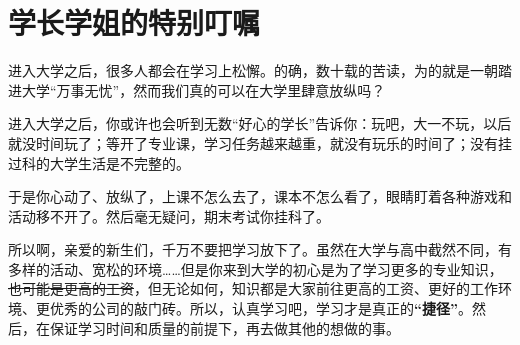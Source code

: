 \section[学长学姐的特别叮嘱]{学长学姐的特别叮嘱}

进入大学之后，很多人都会在学习上松懈。的确，数十载的苦读，为的就是一朝踏进大学“万事无忧”，然而我们真的可以在大学里肆意放纵吗？

进入大学之后，你或许也会听到无数“好心的学长”告诉你：玩吧，大一不玩，以后就没时间玩了；等开了专业课，学习任务越来越重，就没有玩乐的时间了；没有挂过科的大学生活是不完整的。

于是你心动了、放纵了，上课不怎么去了，课本不怎么看了，眼睛盯着各种游戏和活动移不开了。然后毫无疑问，期末考试你挂科\footnotemark 了。

所以啊，亲爱的新生们，千万不要把学习放下了。虽然在大学与高中截然不同，有多样的活动、宽松的环境……但是你来到大学的初心是为了学习更多的专业知识，\sout{也可能是更高的工资}，但无论如何，知识都是大家前往更高的工资、更好的工作环境、更优秀的公司的敲门砖。所以，认真学习吧，学习才是真正的\textbf{“捷径”}。然后，在保证学习时间和质量的前提下，再去做其他的想做的事。
